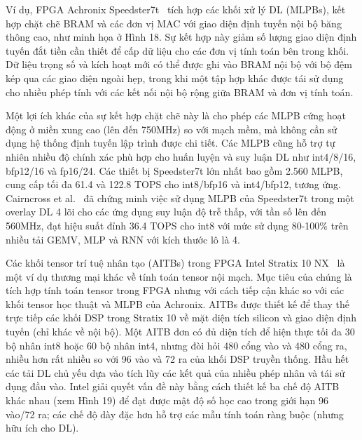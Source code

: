 \documentclass[a4paper]{article}
\begin{document}
Ví dụ, FPGA Achronix Speedster7t~\cite{115} tích hợp các khối xử lý DL (MLPBs), kết hợp chặt chẽ BRAM và các đơn vị MAC với giao diện định tuyến nội bộ băng thông cao, như minh họa ở Hình 18. Sự kết hợp này giảm số lượng giao diện định tuyến đắt tiền cần thiết để cấp dữ liệu cho các đơn vị tính toán bên trong khối. Dữ liệu trọng số và kích hoạt mới có thể được ghi vào BRAM nội bộ với bộ đệm kép qua các giao diện ngoài hẹp, trong khi một tập hợp khác được tái sử dụng cho nhiều phép tính với các kết nối nội bộ rộng giữa BRAM và đơn vị tính toán.

Một lợi ích khác của sự kết hợp chặt chẽ này là cho phép các MLPB cứng hoạt động ở miền xung cao (lên đến 750MHz) so với mạch mềm, mà không cần sử dụng hệ thống định tuyến lập trình được chi tiết. Các MLPB cũng hỗ trợ tự nhiên nhiều độ chính xác phù hợp cho huấn luyện và suy luận DL như int4/8/16, bfp12/16 và fp16/24. Các thiết bị Speedster7t lớn nhất bao gồm 2.560 MLPB, cung cấp tối đa 61.4 và 122.8 TOPS cho int8/bfp16 và int4/bfp12, tương ứng. Cairncross et al.~\cite{116} đã chứng minh việc sử dụng MLPB của Speedster7t trong một overlay DL 4 lõi cho các ứng dụng suy luận độ trễ thấp, với tần số lên đến 560MHz, đạt hiệu suất đỉnh 36.4 TOPS cho int8 với mức sử dụng 80-100\% trên nhiều tải GEMV, MLP và RNN với kích thước lô là 4.

Các khối tensor trí tuệ nhân tạo (AITBs) trong FPGA Intel Stratix 10 NX~\cite{117} là một ví dụ thương mại khác về tính toán tensor nội mạch. Mục tiêu của chúng là tích hợp tính toán tensor trong FPGA nhưng với cách tiếp cận khác so với các khối tensor học thuật và MLPB của Achronix. AITBs được thiết kế để thay thế trực tiếp các khối DSP trong Stratix 10 về mặt diện tích silicon và giao diện định tuyến (chỉ khác về nội bộ). Một AITB đơn có đủ diện tích để hiện thực tối đa 30 bộ nhân int8 hoặc 60 bộ nhân int4, nhưng đòi hỏi 480 cổng vào và 480 cổng ra, nhiều hơn rất nhiều so với 96 vào và 72 ra của khối DSP truyền thống. Hầu hết các tải DL chủ yếu dựa vào tích lũy các kết quả của nhiều phép nhân và tái sử dụng đầu vào. Intel giải quyết vấn đề này bằng cách thiết kế ba chế độ AITB khác nhau (xem Hình 19) để đạt được mật độ số học cao trong giới hạn 96 vào/72 ra; các chế độ dày đặc hơn hỗ trợ các mẫu tính toán ràng buộc (nhưng hữu ích cho DL).
\end{document}
